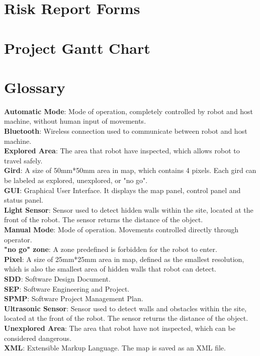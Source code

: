 \documentclass[11pt, a4paper]{report}
\begin{document}
\newpage
\appendix

\chapter{Risk Report Forms}



\chapter{Project Gantt Chart}



\chapter{Glossary}
\textbf{Automatic Mode}:  Mode of operation, completely controlled by robot and host machine, without human input of movements. 
\\ \textbf{Bluetooth}: Wireless connection used to communicate between robot and host machine.
\\ \textbf{Explored Area}: The area that robot have inspected, which allows robot to travel safely.  
\\ \textbf{Gird}: A size of 50mm*50mm area in map, which contains 4 pixels. Each gird can be labeled as explored, unexplored, or "no go".
\\ \textbf{GUI}: Graphical User Interface. It displays the map panel, control panel and status panel.
\\ \textbf{Light Sensor}: Sensor used to detect hidden walls within the site, located at the front of the robot. The sensor returns the distance of the object.
\\ \textbf{Manual Mode}: Mode of operation. Movements controlled directly through operator.
\\ \textbf{"no go" zone}: A zone predefined is forbidden for the robot to enter. 
\\ \textbf{Pixel}: A size of 25mm*25mm area in map, defined as the smallest resolution, which is also the smallest area of hidden walls that robot can detect.  
\\ \textbf{SDD}: Software Design Document.
\\ \textbf{SEP}: Software Engineering and Project.
\\ \textbf{SPMP}: Software Project Management Plan.
\\ \textbf{Ultrasonic Sensor}: Sensor used to detect walls and obstacles within the site, located at the front of the robot. The sensor returns the distance of the object.
\\ \textbf{Unexplored Area}: The area that robot have not inspected, which can be considered dangerous.  
\\ \textbf{XML}: Extensible Markup Language. The map is saved as an XML file.
\end{document}
